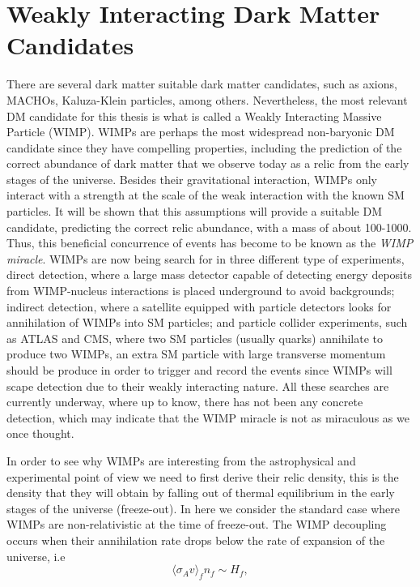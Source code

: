 \section{Weakly Interacting Dark Matter Candidates}
There are several dark matter suitable dark matter candidates, such as
axions, MACHOs, Kaluza-Klein particles, among others. Nevertheless, the most relevant DM candidate for this
thesis is what is called a Weakly Interacting Massive Particle
(WIMP). WIMPs are perhaps the most widespread non-baryonic DM
candidate since they have compelling properties, including the
prediction of the correct abundance of dark matter that we observe
today as a relic from
the early stages of the universe. Besides their gravitational
interaction, WIMPs only interact with a strength
at the scale of the weak interaction with the known SM particles. It
will be shown that this assumptions will provide a suitable DM
candidate, predicting the correct relic abundance, with a mass of
about 100-1000\GeV. Thus, this beneficial concurrence of events has
become to be known as the \textit{WIMP miracle}. WIMPs are now being
search for in three different type of experiments, direct detection,
where a large mass detector capable of detecting energy deposits from
WIMP-nucleus interactions is placed underground to avoid backgrounds;
indirect detection, where a satellite equipped with particle detectors
looks for annihilation of WIMPs into SM particles; and particle collider
experiments, such as ATLAS and CMS, where two SM particles (usually
quarks) annihilate to produce two WIMPs, an extra SM particle with
large transverse momentum should be produce in order to trigger and
record the events since WIMPs will scape detection due to their weakly
interacting nature. All these searches are currently underway, where
up to know, there has not been any concrete detection, which may
indicate that the WIMP miracle is not as miraculous as we once
thought.

In order to see why WIMPs are interesting from the astrophysical and experimental point
of view we need to first derive their relic density, this is the
density that they will obtain by falling out of thermal equilibrium in the
early stages of the universe (freeze-out). In here we consider the standard case
where WIMPs are  non-relativistic at the time of freeze-out. The WIMP
decoupling occurs when their annihilation rate drops below the rate of
expansion of the universe, i.e
\begin{equation}
\label{eq:AnnRate}
\langle \sigma_{A}v\rangle_{f} n_{f} \sim H_{f},
\end{equation}

